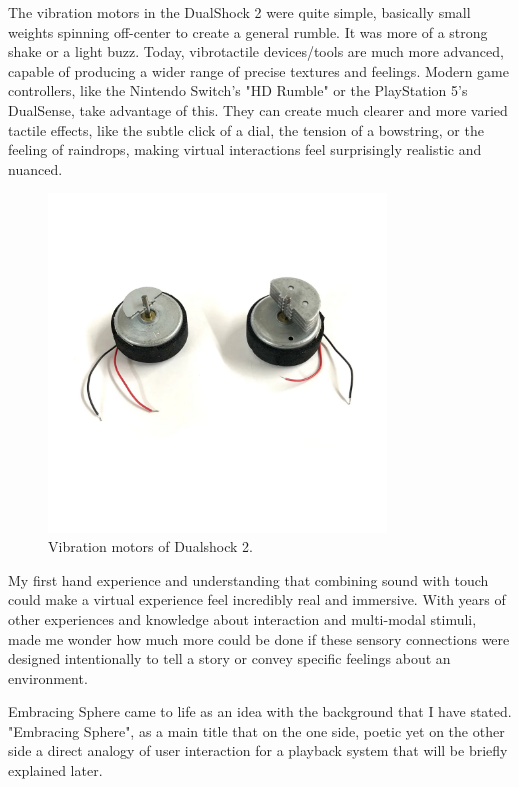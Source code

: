     The vibration motors in the DualShock 2 were quite simple, basically small weights spinning off-center to create a general rumble. It was more of a strong shake or a light buzz\cite{PlayStation_Blogpost}. Today, vibrotactile devices/tools are much more advanced, capable of producing a wider range of precise textures and feelings. Modern game controllers, like the Nintendo Switch's "HD Rumble" or the PlayStation 5's DualSense, take advantage of this. They can create much clearer and more varied tactile effects, like the subtle click of a dial, the tension of a bowstring, or the feeling of raindrops, making virtual interactions feel surprisingly realistic and nuanced.\par

    \begin{figure}[H]
    \centering
    \includegraphics[width=0.8\textwidth]{images/vibration_motors_ds2}
    \caption{Vibration motors of Dualshock 2.}
    \end{figure}

    My first hand experience and understanding that combining sound with touch could make a virtual experience feel incredibly real and immersive. With years of other experiences and knowledge about interaction and multi-modal stimuli, made me wonder how much more could be done if these sensory connections were designed intentionally to tell a story or convey specific feelings about an environment.\par

    Embracing Sphere came to life as an idea with the background that I have stated. "Embracing Sphere", as a main title that on the one side, poetic yet on the other side a direct analogy of user interaction for a playback system that will be briefly explained later.\par
    
